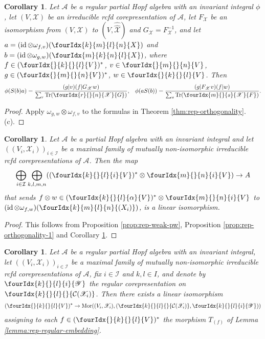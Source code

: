 \documentclass[10pt]{article}
\DeclareMathOperator{\id}{id}
\newcommand{\dual}[1]{#1^{*}}
\newcommand{\dualco}[1]{\hat{#1}}
\newcommand{\Tr}{\mathrm{Tr}}
\newcommand{\Mor}{\mathrm{Mor}}
\newcommand{\Gr}[5]{\fourIdx{#2}{#4}{#3}{#5}{#1}}%
\newcommand{\Gru}[3]{\Gr{#1}{}{}{#2}{#3}}
\newcommand{\Grd}[3]{\Gr{#1}{#2}{#3}{}{}}
\newtheorem{Cor}[Theorem]{Corollary}
\theoremstyle{definition}
\numberwithin{equation}{section}
\begin{document}
\begin{Cor}\label{CorOrth}
  Let $\mathscr{A}$ be a regular partial Hopf algebra with an invariant integral $\phi$, let
  $(V,\mathscr{X})$ be an irreducible rcfd corepresentation of
  $\mathscr{A}$, let $F_{\mathscr{X}}$ be an isomorphism from
  $(V,\mathscr{X})$ to $(V,\dualco{\dualco{\mathscr{X}}})$ and
  $G_{\mathscr{X}}=F^{-1}_{{\mathscr{X}}}$, and let $a=(\id \otimes
  \omega_{f,v})(\Gr{X}{k}{l}{m}{n})$ and $b=(\id \otimes
  \omega_{g,w})(\Gr{X}{m}{n}{k}{l})$, where 
  $f \in   \dual{(\Gru{V}{k}{l})}$, $v \in\Gru{V}{m}{n}$, $g \in
  \dual{(\Gru{V}{m}{n})}$, $w \in  \Gru{V}{k}{l}$.  Then
\begin{align*}
  \phi(S(b)a) &= \frac{(g|v)(f|G_{\mathscr{X}}w)}{\sum_{r}
    \Tr(\Gr{G}{r}{n}{}{\mathscr{X}})}, & \phi(aS(b)) = \frac{(g|F_{\mathscr{X}}v)(f|w)}{\sum_{s}
    \Tr(\Gr{F}{m}{s}{}{\mathscr{X}})}.
\end{align*}
\end{Cor}
\begin{proof}
Apply $\omega_{g,w} \otimes
    \omega_{f,v}$ to the formulas in  Theorem
    \ref{thm:rep-orthogonality}.(c).
\end{proof}
\begin{Cor} \label{cor:rep-pw}
  Let $\mathscr{A}$ be a partial Hopf algebra with an invariant integral and let
  $((V_{i},\mathscr{X}_{i}))_{i \in \mathcal{I}}$ be a maximal family of mutually non-isomorphic irreducible rcfd corepresentations of
  $\mathscr{A}$. Then the map
  \begin{align*}
    \bigoplus_{i \in \mathcal{I}} \bigoplus_{k,l,m,n}
    (\dual{(\Gr{V}{k}{l}{}{i})} \otimes
    \Gr{V}{m}{n}{}{i}) \to A
  \end{align*}
  that sends $f \otimes w \in
  \dual{(\Gr{V}{k}{l}{}{\alpha})} \otimes
  \Gr{V}{m}{n}{}{i}$ to $ (\id \otimes
  \omega_{f,w})(\Gr{(X_{i})}{k}{l}{m}{n})$,
  is a linear isomorphism. 
\end{Cor}
\begin{proof} This follows from Proposition \ref{prop:rep-weak-pw}, Proposition \ref{prop:rep-orthogonality-1} and Corollary \ref{CorOrth}.
\end{proof}
\begin{Cor} \label{cor:rep-pw-morphisms}
  Let $\mathscr{A}$ be a regular partial Hopf algebra with an invariant integral, let
  $((V_{i},\mathscr{X}_{i}))_{i\in \mathcal{I}}$ be a maximal
  family of mutually non-isomorphic irreducible rcfd corepresentations of $\mathscr{A}$,
  fix $i \in \mathcal{I}$ and $k,l\in I$, and denote by $\Gr{\mathscr{Y}}{k}{l}{}{i}$
  the regular corepresentation on
  $\Grd{\mathcal{C}(\mathscr{X}_i)}{k}{l}$. Then there exists a
  linear isomorphism
  \begin{align*}
    \dual{( \Gru{V}{k}{l})} \to
    \Mor((V_{i},\mathscr{X}_{i}),
    (\Grd{\mathcal{C}(\mathscr{X}_i)}{k}{l},\Gr{\mathscr{Y}}{k}{l}{}{i}))
  \end{align*}
  assigning to each $f\in     \dual{( \Gru{V}{k}{l})}$ the morphism
  $T_{(f)}$ of Lemma \ref{lemma:rep-regular-embedding}.
\end{Cor}
\end{document}
